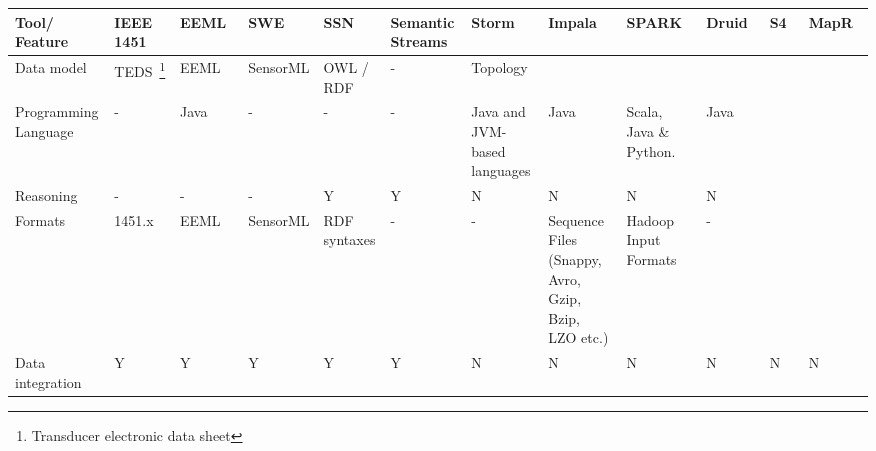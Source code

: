 \begin{sidewaystable}[!ht]
\renewcommand{\arraystretch}{1.3}
\tiny
\begin{center}
\begin{tabular}[c]{|p{1.7cm}|p{1.5cm}|p{1.5cm}|p{1.5cm}|p{1.5cm}|p{1.5cm}|p{1.5cm}|p{1.5cm}|p{1.5cm}|p{1.5cm}|p{1.5cm}|p{1.5cm}|} 
\hline
 \textbf{Tool/ Feature} & IEEE 1451 &  EEML~\cite{eeml} & SWE~\cite{sensorweb-wb} & SSN~\cite{Compton:2012:OPS:2400766.2401456} & Semantic Streams~\cite{Whitehouse:2006:SSF:2180141.2180148} & Storm~\cite{BigDataManing} & Impala~\cite{impala-project} & SPARK~\cite{zaharia2012discretized} & Druid~\cite{yangdruid} & S4~\cite{neumeyer2010s4}  & MapR~\cite{mapr-project}\\ \hline
  Data model & TEDS~\footnote{Transducer electronic data sheet} & EEML & SensorML & OWL / RDF & -  & Topology &  &  &  &  & \\ \hline  
  Programming Language & - &  Java & - & -& - & Java and JVM-based languages & Java & Scala, Java \& Python. & Java &  & \\ \hline  
  Reasoning & - & - &  - & Y & Y & N & N & N & N &  & \\ \hline  
  Formats & 1451.x & EEML & SensorML & RDF syntaxes & - & - & Sequence Files (Snappy, Avro, Gzip, Bzip, LZO etc.) & Hadoop Input Formats & - &  & \\ \hline  
  Data integration & Y & Y & Y  & Y & Y & N & N & N & N & N & N \\ \hline  

\end{tabular}
\end{center}
\end{sidewaystable}
